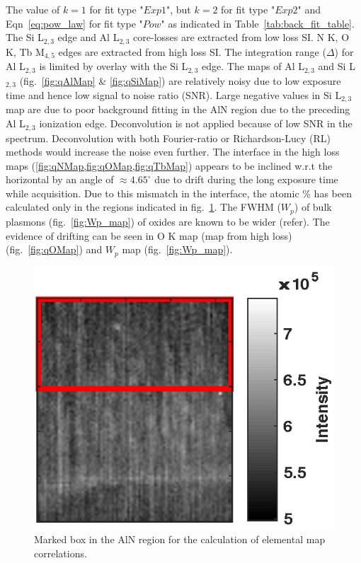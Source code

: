 \documentclass[%
 aip,
rsi,%
 amsmath,amssymb,
 reprint,%
]{revtex4-1}
\begin{document}
The value of $k = 1$ for fit type "$Exp1$", but $k = 2$ for fit type "$Exp2$" and Eqn~\ref{eq:pow_law} for fit type "$Pow$" as indicated in Table~\ref{tab:back_fit_table}. The Si L$_{2,3}$ edge and Al L$_{2,3}$ core-losses are extracted from low loss SI. N K, O K, Tb M$_{4,5}$ edges are extracted from high loss SI. The integration range ($\Delta$) for Al L$_{2,3}$ is limited by overlay with the Si L$_{2,3}$ edge. The maps of Al L$_{2,3}$ and Si L$_{2,3}$ (fig.~\ref{fig:qAlMap} \& \ref{fig:qSiMap}) are relatively noisy due to low exposure time and hence low signal to noise ratio (SNR). Large negative values in Si L$_{2,3}$ map are due to poor background fitting in the AlN region due to the preceding Al L$_{2,3}$ ionization edge. Deconvolution is not applied because of low SNR in the spectrum. Deconvolution with both Fourier-ratio or Richardson-Lucy (RL) methods would increase the noise even further. The interface in the high loss maps (\cref{fig:qNMap,fig:qOMap,fig:qTbMap}) appears to be inclined w.r.t the horizontal by an angle of $\approx4.65^\circ$ due to drift during the long exposure time while acquisition. Due to this mismatch in the interface, the atomic \% has been calculated only in the regions indicated in fig.~\ref{fig:40x87}. The FWHM  ($W_p$) of bulk plasmons (fig.~\ref{fig:Wp_map}) of oxides are known to be wider (refer). The evidence of drifting can be seen in O K map (map from high loss) (fig.~\ref{fig:qOMap}) and $W_p$ map (fig.~\ref{fig:Wp_map}).
\begin{figure}
	\includegraphics[scale=0.75]{40x87_region}
    \caption{Marked box in the AlN region for the calculation of elemental map correlations.}
    \label{fig:40x87}
\end{figure}
\end{document}
